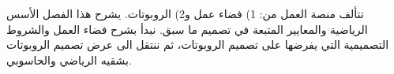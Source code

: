 تتألف منصة العمل من: 1) فضاء عمل و2) الروبوتات. يشرح هذا الفصل الأسس الرياضية والمعايير المتبعة في تصميم ما سبق. نبدأ بشرح فضاء العمل والشروط التصميمية التي يفرضها على تصميم الروبوتات، ثم ننتقل الى عرض تصميم الروبوتات بشقيه الرياضي والحاسوبي.